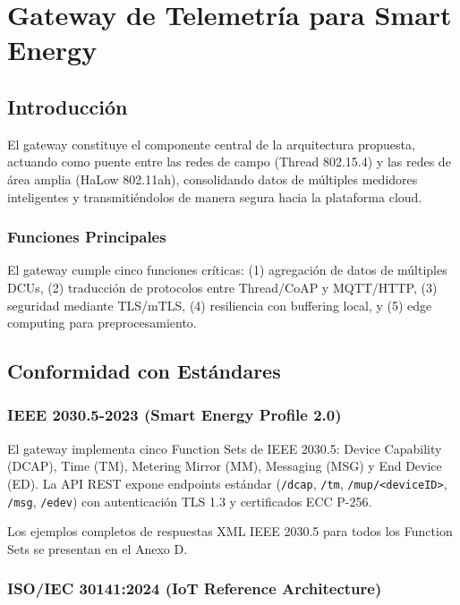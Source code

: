 ﻿\chapter{Gateway de Telemetría para Smart Energy}

\section{Introducción}

El gateway constituye el componente central de la arquitectura propuesta, actuando como puente entre las redes de campo (Thread 802.15.4) y las redes de área amplia (HaLow 802.11ah), consolidando datos de múltiples medidores inteligentes y transmitiéndolos de manera segura hacia la plataforma cloud.

\subsection{Funciones Principales}

El gateway cumple cinco funciones críticas: (1) agregación de datos de múltiples DCUs, (2) traducción de protocolos entre Thread/CoAP y MQTT/HTTP, (3) seguridad mediante TLS/mTLS, (4) resiliencia con buffering local, y (5) edge computing para preprocesamiento.

\section{Conformidad con Estándares}

\subsection{IEEE 2030.5-2023 (Smart Energy Profile 2.0)}

El gateway implementa cinco Function Sets de IEEE 2030.5: Device Capability (DCAP), Time (TM), Metering Mirror (MM), Messaging (MSG) y End Device (ED). La API REST expone endpoints estándar (\texttt{/dcap}, \texttt{/tm}, \texttt{/mup/<deviceID>}, \texttt{/msg}, \texttt{/edev}) con autenticación TLS 1.3 y certificados ECC P-256.

Los ejemplos completos de respuestas XML IEEE 2030.5 para todos los Function Sets se presentan en el Anexo D.

\subsection{ISO/IEC 30141:2024 (IoT Reference Architecture)}

